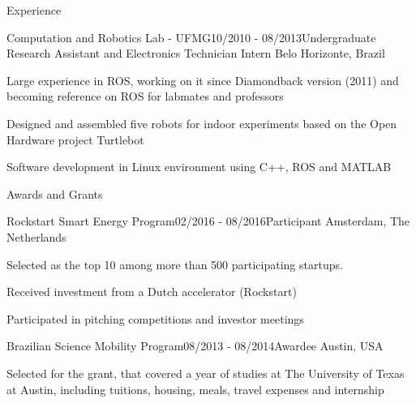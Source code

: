\documentclass[14pt, a4paper]{resume} %
\begin{document}
\begin{rSection}{Experience}
\begin{rSubsection}{Computation and Robotics Lab - UFMG}{10/2010 - 08/2013}{\normalfont Undergraduate Research Assistant and Electronics Technician Intern}{ \normalfont Belo Horizonte, Brazil}
	\item Large experience in ROS, working on it since Diamondback version (2011) and becoming reference on ROS for labmates and professors
 	\item Designed and assembled five robots for indoor experiments based on the Open Hardware project Turtlebot
 	\item Software development in Linux environment using C++, ROS and MATLAB
 	\newline
 	\newline
 	 	\newline
\end{rSubsection}
\end{rSection}



\begin{rSection}{Awards and Grants}
	\begin{rSubsection}{Rockstart Smart Energy Program}{02/2016 - 08/2016}{Participant}{ \normalfont Amsterdam, The Netherlands}
		\item Selected as the top 10 among more than 500 participating startups.
		\item Received investment from a Dutch accelerator (Rockstart)
		\item Participated in pitching competitions and investor meetings
	\end{rSubsection}
	
\begin{rSubsection}{Brazilian Science Mobility Program}{08/2013 - 08/2014}{Awardee}{ \normalfont Austin, USA}
	\item Selected for the grant, that covered a year of studies at The University of Texas at Austin, including tuitions, housing, meals, travel expenses and internship
\end{rSubsection}

\end{rSection}
\end{document}
